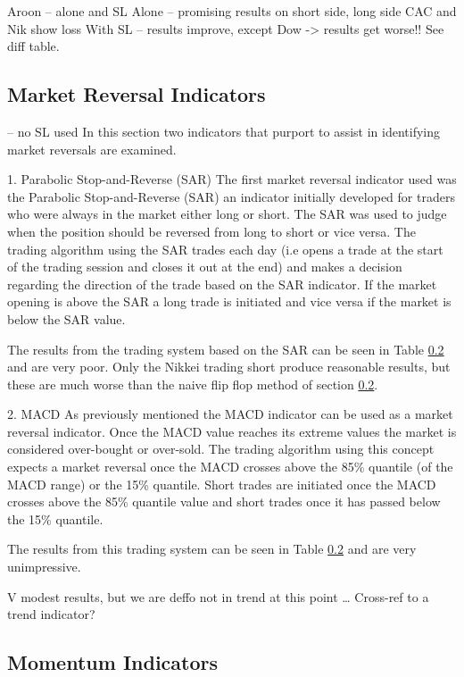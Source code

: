Aroon – alone and SL
Alone – promising results on short side, long side CAC and Nik show loss
With SL – results improve, except Dow -> results get worse!!  See diff table.

\subsection{Market Reversal Indicators} – no SL used
In this section  two indicators that purport to assist in identifying market reversals are examined.

1. Parabolic Stop-and-Reverse (SAR)
The first market reversal indicator used was the Parabolic Stop-and-Reverse (SAR) an indicator initially developed for traders who were always in the market either long or short. The SAR was used to judge when the  position should be reversed from long to short or vice versa. The trading algorithm using the SAR trades each day (i.e opens a trade at the start of the trading session and closes it out at the end) and makes a decision regarding the direction of the trade based on the SAR indicator. If the market opening is above the SAR a long trade is initiated and vice versa if the market is below the SAR value.

The results from the trading system based on the SAR can be seen in Table \ref{} and are very poor. Only the Nikkei trading short produce reasonable results, but these are much worse than the naive flip flop method of section \ref{}.

2.	MACD
As previously mentioned the MACD indicator can be used as a market reversal indicator. Once the MACD value reaches its extreme values the market is considered over-bought or over-sold. The trading algorithm using this concept expects a market reversal once the MACD crosses above the 85\% quantile (of the MACD range) or the 15\% quantile. Short trades are initiated once the MACD crosses above the 85\% quantile value and short trades once it has passed below the 15\% quantile.

The results from this trading system can be seen in Table \ref{} and are very unimpressive. 

V modest results, but we are deffo not in trend at this point …  Cross-ref to a trend indicator?

\subsection{Momentum Indicators}

